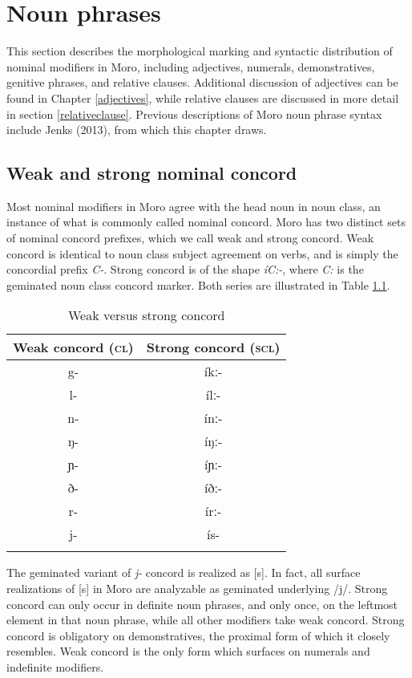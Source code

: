 \chapter{Noun phrases}\label{chapter:nounphrase}

This section describes the morphological marking and syntactic distribution of nominal modifiers in Moro, including adjectives, numerals, demonstratives, genitive phrases, and relative clauses. Additional discussion of adjectives can be found in Chapter \ref{adjectives}, while relative clauses are discussed in more detail in section \ref{relativeclause}. Previous descriptions of Moro noun phrase syntax include Jenks (2013), from which this chapter draws.

\section{Weak and strong nominal concord}\label{concord}

Most nominal modifiers in Moro agree with the head noun in noun class, an instance of what is commonly called nominal concord. Moro has two distinct sets of nominal concord prefixes, which we call weak and strong concord. Weak concord is identical to noun class subject agreement on verbs, and is simply the concordial prefix \textit{C-}. Strong concord is of the shape \textit{íC:-}, where \textit{C:} is the geminated noun class concord marker.  Both series are illustrated in Table \ref{tab:ch8:1}.

\begin{table}
	\begin{tabular}[t]{cc}
\lsptoprule
Weak concord (\textsc{cl}) & Strong concord (\textsc{scl}) \\
\midrule
g-	&	íkː-	\\
l-	&	ílː-	\\
n-	&	ínː-	\\
ŋ-	&	íŋː-	\\
ɲ-	&	íɲː-	\\
ð-	&	íðː-	\\
r-	&	írː-	\\
j- &	ís- 	\\
\lspbottomrule	
\end{tabular}
  \caption{Weak versus strong concord}
  \label{tab:ch8:1}
\end{table}
The geminated variant of \textit{j-} concord is realized as [s]. In fact, all surface realizations of [s] in Moro are analyzable as geminated underlying /j/. Strong concord can only occur in definite noun phrases, and only once, on the leftmost element in that noun phrase, while all other modifiers take weak concord. Strong concord is obligatory on demonstratives, the proximal form of which it closely resembles. Weak concord is the only form which surfaces on numerals and indefinite modifiers. 

